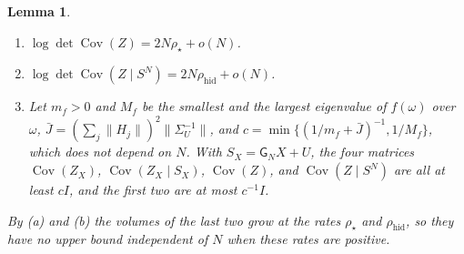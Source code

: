 \documentclass[11pt,onecolumn]{IEEEtran}
\newtheorem{lemma}[theorem]{Lemma}
\newcommand{\Cov}{\operatorname{Cov}}
\newcommand{\rhid}{\rho_{\mathrm{hid}}}
\begin{document}
\begin{lemma}\label{lem:endpoint}
\begin{enumerate}
\item[(a)] $\log\det\Cov(Z)=2N\rho_\star+o(N)$.
\item[(b)] $\log\det\Cov(Z\mid S^N)=2N\rhid+o(N)$.
\item[(c)] Let $m_f>0$ and $M_f$ be the smallest and the largest
eigenvalue of $f(\omega)$ over $\omega$,
$\bar J=(\sum_j\|H_j\|)^2\|\Sigma_U^{-1}\|$, and
$c=\min\{(1/m_f+\bar J)^{-1},1/M_f\}$, which does not depend on $N$.
With $S_X=\mathsf G_NX+U$, the four matrices $\Cov(Z_X)$,
$\Cov(Z_X\mid S_X)$, $\Cov(Z)$, and $\Cov(Z\mid S^N)$ are all at least
$cI$, and the first two are at most $c^{-1}I$.
\end{enumerate}
By (a) and (b) the volumes of the last two grow at the rates $\rho_\star$
and $\rhid$, so they have no upper bound independent of $N$ when these
rates are positive.
\end{lemma}
\end{document}

